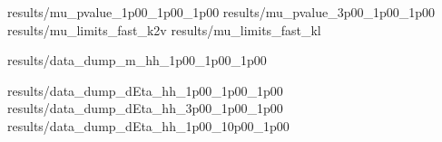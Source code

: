 {results/mu_pvalue_1p00_1p00_1p00}
{results/mu_pvalue_3p00_1p00_1p00}
{results/mu_limits_fast_k2v}
{results/mu_limits_fast_kl}

{results/data_dump_m_hh_1p00_1p00_1p00}

{results/data_dump_dEta_hh_1p00_1p00_1p00}
{results/data_dump_dEta_hh_3p00_1p00_1p00}
{results/data_dump_dEta_hh_1p00_10p00_1p00}
